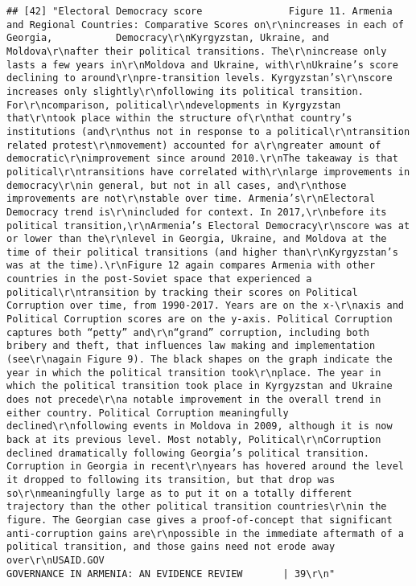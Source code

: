 \documentclass[
]{article}
\begin{document}
\begin{verbatim}
## [42] "Electoral Democracy score               Figure 11. Armenia and Regional Countries: Comparative Scores on\r\nincreases in each of Georgia,           Democracy\r\nKyrgyzstan, Ukraine, and Moldova\r\nafter their political transitions. The\r\nincrease only lasts a few years in\r\nMoldova and Ukraine, with\r\nUkraine’s score declining to around\r\npre-transition levels. Kyrgyzstan’s\r\nscore increases only slightly\r\nfollowing its political transition. For\r\ncomparison, political\r\ndevelopments in Kyrgyzstan that\r\ntook place within the structure of\r\nthat country’s institutions (and\r\nthus not in response to a political\r\ntransition related protest\r\nmovement) accounted for a\r\ngreater amount of democratic\r\nimprovement since around 2010.\r\nThe takeaway is that political\r\ntransitions have correlated with\r\nlarge improvements in democracy\r\nin general, but not in all cases, and\r\nthose improvements are not\r\nstable over time. Armenia’s\r\nElectoral Democracy trend is\r\nincluded for context. In 2017,\r\nbefore its political transition,\r\nArmenia’s Electoral Democracy\r\nscore was at or lower than the\r\nlevel in Georgia, Ukraine, and Moldova at the time of their political transitions (and higher than\r\nKyrgyzstan’s was at the time).\r\nFigure 12 again compares Armenia with other countries in the post-Soviet space that experienced a political\r\ntransition by tracking their scores on Political Corruption over time, from 1990-2017. Years are on the x-\r\naxis and Political Corruption scores are on the y-axis. Political Corruption captures both “petty” and\r\n“grand” corruption, including both bribery and theft, that influences law making and implementation (see\r\nagain Figure 9). The black shapes on the graph indicate the year in which the political transition took\r\nplace. The year in which the political transition took place in Kyrgyzstan and Ukraine does not precede\r\na notable improvement in the overall trend in either country. Political Corruption meaningfully declined\r\nfollowing events in Moldova in 2009, although it is now back at its previous level. Most notably, Political\r\nCorruption declined dramatically following Georgia’s political transition. Corruption in Georgia in recent\r\nyears has hovered around the level it dropped to following its transition, but that drop was so\r\nmeaningfully large as to put it on a totally different trajectory than the other political transition countries\r\nin the figure. The Georgian case gives a proof-of-concept that significant anti-corruption gains are\r\npossible in the immediate aftermath of a political transition, and those gains need not erode away over\r\nUSAID.GOV                                                   GOVERNANCE IN ARMENIA: AN EVIDENCE REVIEW       | 39\r\n"                                                                                                                                                                                                                                                                                                                                                                                                                                                                                                                                        
\end{verbatim}
\end{document}
